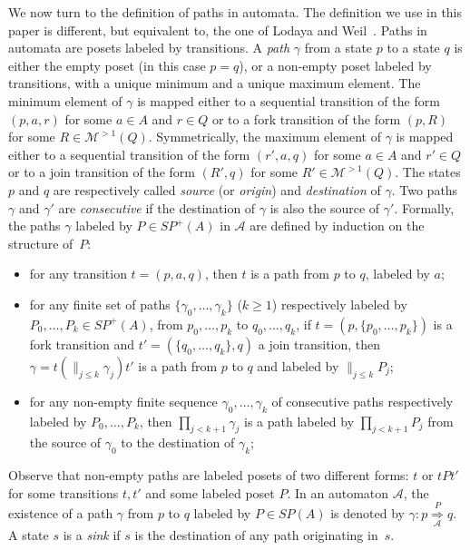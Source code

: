 \documentclass{CSML}
\begin{document}
We now turn to the definition of paths in automata. The definition we use in this paper is different, but equivalent to, the one of Lodaya and Weil~\cite{lodaya98kleene,LW98:Algebra,LW00:sp,lodaya01kleene}.
Paths in automata are posets labeled by transitions.
A \emph{path} $\gamma$ from a state $p$ to a state $q$ is either the empty poset (in this case $p=q$), or a non-empty poset labeled by transitions, with a unique minimum and a unique maximum element. The minimum element of $\gamma$ is mapped either to a sequential transition of the form $(p,a,r)$ for some $a\in A$ and $r\in Q$ or to a fork transition of the form $(p,R)$ for some $R\in{\mathcal M}^{>1}(Q)$. Symmetrically, the maximum element  of $\gamma$ is mapped either to a sequential transition of the form $(r',a,q)$ for some $a\in A$ and $r'\in Q$ or to a join transition of the form $(R',q)$ for some $R'\in{\mathcal M}^{>1}(Q)$. The states $p$ and $q$ are respectively called \emph{source} (or \emph{origin}) and \emph{destination} of $\gamma$. Two paths $\gamma$ and $\gamma'$ are \emph{consecutive} if the destination of $\gamma$ is also the source of $\gamma'$.
Formally, the paths $\gamma$ labeled by $P\in SP^+(A)$ in $\mathcal{A}$ are defined by induction on the structure of~$P$:
\begin{itemize}
\item for any transition $t=(p,a,q)$, then $t$ is a path from $p$ to $q$, labeled by $a$;
\item for any finite set of paths $\{\gamma_0,\dots,\gamma_k\}$ ($k\geq 1$) respectively labeled by $P_0,\dots,P_k\in SP^+(A)$, from $p_0,\dots,p_k$ to $q_0,\dots, q_k$, if $t=(p,\{p_0,\dots,p_k\})$ is a fork transition and $t'=(\{q_0,\dots,q_k\},q)$ a join transition, then $\gamma=t(\parallel_{j\leq k} \gamma_j)t'$ is a path from $p$ to $q$ and labeled by $\parallel_{j\leq k} P_j$;
\item for any non-empty finite sequence $\gamma_0,\dots,\gamma_k$ of consecutive paths respectively labeled by $P_0,\dots,P_k$, then $\prod_{j<k+1}\gamma_j$ is a path labeled by $\prod_{j<k+1}P_j$ from the source of  $\gamma_{0}$ to the destination of $\gamma_{k}$;
\end{itemize}
Observe that non-empty paths are labeled posets of two different forms: $t$ or $tPt'$ for some transitions $t,t'$ and some labeled poset $P$.
In an automaton $\mathcal{A}$, the existence of a path $\gamma$ from $p$ to $q$ labeled by $P\in SP(A)$ is denoted by $\gamma : p \mathop{\Longrightarrow}\limits_{\mathcal{A}}^{P} q$. 
A state $s$ is a \emph{sink} if $s$ is the destination of any path originating in~$s$.
\end{document}
